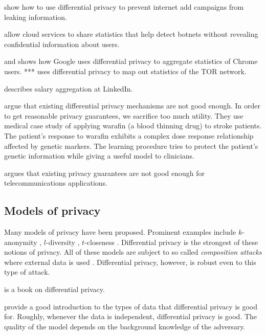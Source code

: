 \documentclass{icopust}
\begin{document}
\cite{lindell2011practical} show how to use differential privacy to prevent internet add campaigns from leaking information.

\cite{reed2010differential} allow cloud services to share statistics that help detect botnets without revealing confidential information about users.

\cite{erlingsson2014rappor} and \cite{fanti2016building} shows how Google uses differential privacy to aggregate statistics of Chrome users.
*** \cite{jansen2016tor} uses differential privacy to map out statistics of the TOR network.

\cite{kenthapadi2017bringing} describes salary aggregation at LinkedIn.

\cite{malin2013biomedical} argue that existing differential privacy mechanisms are not good enough.
In order to get reasonable privacy guarantees, we sacrifice too much utility.
They use medical case study of applying warafin (a blood thinning drug) to stroke patients.
The patient's response to warafin exhibits a complex dose response relationship affected by genetic markers.
The learning procedure tries to protect the patient's genetic information while giving a useful model to clinicians.

\cite{hu2015differential} argues that existing privacy guarantees are not good enough for telecommunications applications.

\subsection{Models of privacy}

Many models of privacy have been proposed.
Prominent examples include $k$-anonymity \cite{sweeny2002k}, $l$-diversity \cite{machanavajjhala2007diversity}, $t$-closeness \cite{li2007t}.
Differential privacy is the strongest of these notions of privacy.
All of these models are subject to so called \emph{composition attacks} where external data is used \cite{ganta2008composition}.
Differential privacy, however, is robust even to this type of attack.

\cite{dwork2014algorithmic} is a book on differential privacy.

\cite{kifer2011no} provide a good introduction to the types of data that differential privacy is good for.
Roughly, whenever the data is independent, differential privacy is good.
The quality of the model depends on the background knowledge of the adversary.
\end{document}
